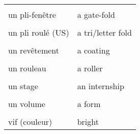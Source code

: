 \documentclass[
  10pt,
]{article}
\begin{document}
\begin{longtable}{ll}
\cellcolor{gray!6}{un pli} & \cellcolor{gray!6}{a fold}\\

un pli-fenêtre & a gate-fold\\

\cellcolor{gray!6}{un pli roulé (UK)} & \cellcolor{gray!6}{a roll fold}\\

un pli roulé (US) & a tri/letter fold\\

\cellcolor{gray!6}{un rabat} & \cellcolor{gray!6}{a flap}\\

un revêtement & a coating\\

\cellcolor{gray!6}{ \vphantom{1}& }\\

\multirow[t]{-2}{*}{\raggedright\arraybackslash un rouleau} & \multirow[t]{-2}{*}{\raggedright\arraybackslash a roller}\\

 & \\

\multirow[t]{-2}{*}{\raggedright\arraybackslash un stage} & \multirow[t]{-2}{*}{\raggedright\arraybackslash an internship}\\

\cellcolor{gray!6}{un trait} & \cellcolor{gray!6}{a stroke}\\

un volume & a form\\

\cellcolor{gray!6}{vernis sélectif} & \cellcolor{gray!6}{spot varnish}\\

vif (couleur) & bright\\
\bottomrule
\end{longtable}
\end{document}
